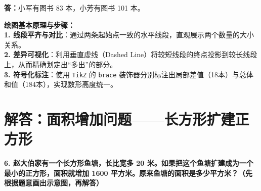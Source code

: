 \documentclass[12pt, a4paper]{ctexrep}
\begin{document}
\vspace{0.2cm}
\noindent\textbf{答：}小军有图书 83 本，小芳有图书 101 本。

\vspace{0.6cm}

{\small\color{blue!70!black}
\textbf{绘图基本原理与步骤：}\\
\textbf{1. 线段平齐与对比}：通过两条起始点一致的水平线段，直观展示两个数量的大小关系。\\
\textbf{2. 差异可视化}：利用垂直虚线（Dashed Line）将较短线段的终点投影到较长线段上，从而精确划定出“多出”的部分。\\
\textbf{3. 符号化标注}：使用 \texttt{TikZ} 的 \texttt{brace} 装饰器分别标注出局部差值（18本）与总体和值（184本），实现数形高度统一。
}

\newpage

\section{解答：面积增加问题——长方形扩建正方形}

\vspace{0.4cm}

\noindent\textbf{6. 赵大伯家有一个长方形鱼塘，长比宽多 20 米。如果把这个鱼塘扩建成为一个最小的正方形，面积就增加 1600 平方米。原来鱼塘的面积是多少平方米？（先根据题意画出示意图，再解答）}

\vspace{0.8cm}

\begin{center}
\end{center}

\vspace{0.6cm}
\end{document}
